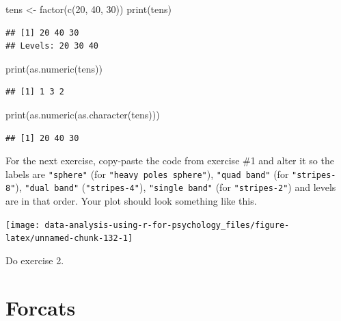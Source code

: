 \documentclass[
]{book}
\newenvironment{Shaded}{\begin{snugshade}}{\end{snugshade}}
\newcommand{\DecValTok}[1]{\textcolor[rgb]{0.00,0.00,0.81}{#1}}
\newcommand{\FunctionTok}[1]{\textcolor[rgb]{0.00,0.00,0.00}{#1}}
\newcommand{\NormalTok}[1]{#1}
\newcommand{\OtherTok}[1]{\textcolor[rgb]{0.56,0.35,0.01}{#1}}
\begin{document}
\begin{Shaded}
\begin{Highlighting}[]
\NormalTok{tens }\OtherTok{\textless{}{-}} \FunctionTok{factor}\NormalTok{(}\FunctionTok{c}\NormalTok{(}\DecValTok{20}\NormalTok{, }\DecValTok{40}\NormalTok{, }\DecValTok{30}\NormalTok{))}
\FunctionTok{print}\NormalTok{(tens)}
\end{Highlighting}
\end{Shaded}

\begin{verbatim}
## [1] 20 40 30
## Levels: 20 30 40
\end{verbatim}

\begin{Shaded}
\begin{Highlighting}[]
\FunctionTok{print}\NormalTok{(}\FunctionTok{as.numeric}\NormalTok{(tens))}
\end{Highlighting}
\end{Shaded}

\begin{verbatim}
## [1] 1 3 2
\end{verbatim}

\begin{Shaded}
\begin{Highlighting}[]
\FunctionTok{print}\NormalTok{(}\FunctionTok{as.numeric}\NormalTok{(}\FunctionTok{as.character}\NormalTok{(tens)))}
\end{Highlighting}
\end{Shaded}

\begin{verbatim}
## [1] 20 40 30
\end{verbatim}

For the next exercise, copy-paste the code from exercise \#1 and alter it so the labels are \texttt{"sphere"} (for \texttt{"heavy\ poles\ sphere"}), \texttt{"quad\ band"} (for \texttt{"stripes-8"}), \texttt{"dual\ band"} (\texttt{"stripes-4"}), \texttt{"single\ band"} (for \texttt{"stripes-2"}) and levels are in that order. Your plot should look something like this.

\begin{center}\texttt{[image: data-analysis-using-r-for-psychology\_files/figure-latex/unnamed-chunk-132-1]} \end{center}

Do exercise 2.

\hypertarget{forcats}{%
\section{Forcats}\label{forcats}}
\end{document}
